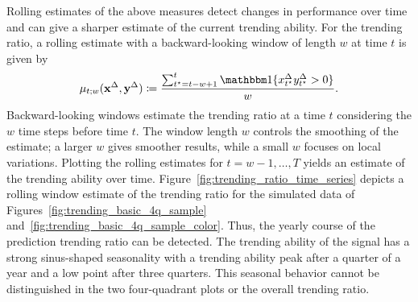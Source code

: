 Rolling estimates of the above measures detect changes in performance over time and can give a sharper estimate of the current trending ability.
For the trending ratio, a rolling estimate with a backward-looking window of length $w$ at time $t$ is given by
\begin{equation*}
    \acc_{t; w} (\diffx, \diffy) \coloneqq \frac{\sum_{t^\star = t-w + 1}^{t} \ind{\diffxt[t^\star] \diffyt[t^\star] > 0}}{w}.\label{eq:acc_rolling}
\end{equation*}
Backward-looking windows estimate the trending ratio at a time $t$ considering the $w$ time steps before time $t$.
The window length $w$ controls the smoothing of the estimate; a larger $w$ gives smoother results, while a small $w$ focuses on local variations.
Plotting the rolling estimates for $t = w-1, \dots, T$ yields an estimate of the trending ability over time.
Figure~\ref{fig:trending_ratio_time_series} depicts a rolling window estimate of the trending ratio for the simulated data of Figures~\ref{fig:trending_basic_4q_sample} and~\ref{fig:trending_basic_4q_sample_color}.
Thus, the yearly course of the prediction trending ratio can be detected.
The trending ability of the signal has a strong sinus-shaped seasonality with a trending ability peak after a quarter of a year and a low point after three quarters.
This seasonal behavior cannot be distinguished in the two four-quadrant plots or the overall trending ratio.


